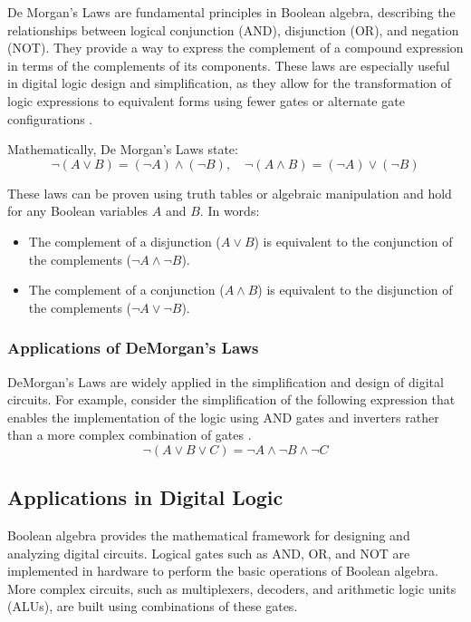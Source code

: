 De Morgan's Laws are fundamental principles in Boolean algebra, describing the relationships between logical conjunction (AND), disjunction (OR), and negation (NOT). They provide a way to express the complement of a compound expression in terms of the complements of its components. These laws are especially useful in digital logic design and simplification, as they allow for the transformation of logic expressions to equivalent forms using fewer gates or alternate gate configurations \cite{rosen2018, tanenbaum2013}.

Mathematically, De Morgan's Laws state:
\[
\neg (A \lor B) = (\neg A) \land (\neg B), \quad \neg (A \land B) = (\neg A) \lor (\neg B)
\]

These laws can be proven using truth tables or algebraic manipulation and hold for any Boolean variables \( A \) and \( B \). In words:
\begin{itemize}
    \item The complement of a disjunction (\( A \lor B \)) is equivalent to the conjunction of the complements (\( \neg A \land \neg B \)).
    \item The complement of a conjunction (\( A \land B \)) is equivalent to the disjunction of the complements (\( \neg A \lor \neg B \)).
\end{itemize}

\subsubsection{Applications of DeMorgan's Laws}
DeMorgan’s Laws are widely applied in the simplification and design of digital circuits. For example, consider the simplification of the following expression that enables the implementation of the logic using AND gates and inverters rather than a more complex combination of gates \cite{rosen2018, karnaugh1953}.
\[
\neg (A \lor B \lor C) = \neg A \land \neg B \land \neg C
\]

\subsection{Applications in Digital Logic}
Boolean algebra provides the mathematical framework for designing and analyzing digital circuits. Logical gates such as AND, OR, and NOT are implemented in hardware to perform the basic operations of Boolean algebra. More complex circuits, such as multiplexers, decoders, and arithmetic logic units (ALUs), are built using combinations of these gates.

